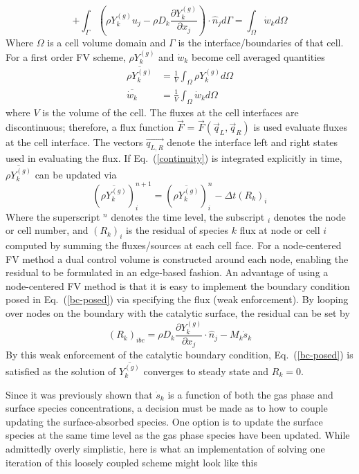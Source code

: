 \documentclass{report}
\newcommand{\eref}[1]{Eq.~(\ref{#1})}
\newcommand{\sk}{\dot{s}_k}
\newcommand{\wk}{\dot{w}_k}
\newcommand{\ry}{{\rho Y_{k}^{(g)}}}
\newcommand{\yk}{{Y_{k}^{(g)}}}
\newcommand{\dint}[1]{\int_{\Omega}{#1} d \Omega}
\newcommand{\fint}[1]{\int_{\Gamma}{#1} d \Gamma}
\newcommand{\flux}{\vec{F}}
\begin{document}
\begin{enumerate}[label=(\alph*)]
\begin{equation}
      + \fint{\left( \ry u_j - \rho D_k
        \frac{\partial Y_{k}^{(g)}}{\partial x_j}\right) \cdot \hat{n}_j }
      = \dint{\wk}
      \label{continuity}
    \end{equation}
    Where $\Omega$ is a cell volume domain and $\Gamma$ is the
    interface/boundaries of that cell.  For a first order FV scheme, $\ry$ and
    $\wk$ become cell averaged quantities
    \begin{align}
      \overline{\ry} &= \frac{1}{V}\dint{\ry} \\
      \overline{\wk} &= \frac{1}{V}\dint{\wk}
      \label{avg-q}
    \end{align}
    where $V$ is the volume of the cell. The fluxes at the cell interfaces are
    discontinuous; therefore, a flux function $\flux$ = $\flux (\vec{q}_L,
    \vec{q}_R)$ is used evaluate fluxes at the cell interface.  The vectors
    $\vec{q_{L,R}}$ denote the interface left and right states used in
    evaluating the flux. If \eref{continuity} is integrated explicitly in time,
    $\overline{\ry}$ can be updated via
    \begin{equation}
      (\overline{\ry})_{i}^{n+1} = (\overline{\ry})^{n}_i - \Delta t (R_k)_i
      \label{expl-fv}
    \end{equation}
    Where the superscript $^n$ denotes the time level, the subscript $_i$
    denotes the node or cell number, and $(R_k)_i$ is the residual of species
    $k$ flux at node or cell $i$ computed by summing the fluxes/sources at each
    cell face.  For a node-centered FV method a dual control volume is
    constructed around each node, enabling the residual to be formulated in an
    edge-based fashion.  An advantage of using a node-centered FV method is that
    it is easy to implement the boundary condition posed in \eref{bc-posed} via
    specifying the flux (weak enforcement).  By looping over nodes on the
    boundary with the catalytic surface, the residual can be set by
    \begin{equation}
      (R_k)_{ibc} = \rho D_k \frac{\partial Y_k^{(g)}}{\partial x_j} \cdot \hat{n}_j
      - M_k \sk
      \label{res-bc}
    \end{equation}
    By this weak enforcement of the catalytic boundary condition,
    \eref{bc-posed} is satisfied as the solution of $\overline{\yk}$ converges
    to steady state and $R_k = 0$.

    Since it was previously shown that $\sk$ is a
    function of both the gas phase and surface species concentrations, a
    decision must be made as to how to couple updating the surface-absorbed
    species.  One option is to update the surface species at the same time
    level as the gas phase species have been updated.  While admittedly overly
    simplistic, here is what an implementation of solving one iteration of this
    loosely coupled scheme might look like this


\end{enumerate}
\end{document}
